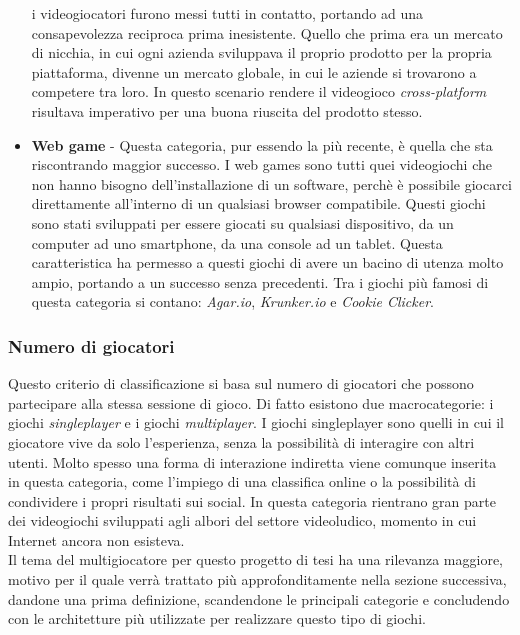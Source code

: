 \begin{itemize}
                    i videogiocatori furono messi tutti in contatto, portando ad una consapevolezza reciproca prima inesistente. Quello che prima era un mercato di nicchia, in cui
                    ogni azienda sviluppava il proprio prodotto per la propria piattaforma, divenne un mercato globale, in cui le aziende si trovarono a competere tra loro. In questo
                    scenario rendere il videogioco \textit{cross-platform} risultava imperativo per una buona riuscita del prodotto stesso. 
                \item \textbf{Web game} - Questa categoria, pur essendo la più recente, è quella che sta riscontrando maggior successo. I web games sono tutti quei videogiochi
                    che non hanno bisogno dell'installazione di un software, perchè è possibile giocarci direttamente all'interno di un qualsiasi browser compatibile. Questi giochi 
                    sono stati sviluppati per essere giocati su qualsiasi dispositivo, da un computer ad uno smartphone, da una console ad un tablet. Questa caratteristica ha 
                    permesso a questi giochi di avere un bacino di utenza molto ampio, portando a un successo senza precedenti. Tra i giochi più famosi di questa categoria si contano: 
                    \textit{Agar.io}, \textit{Krunker.io} e \textit{Cookie Clicker}.
            \end{itemize} 

        \subsubsection{Numero di giocatori}
            Questo criterio di classificazione si basa sul numero di giocatori che possono partecipare alla stessa sessione di gioco. Di fatto esistono due macrocategorie: i
            giochi \textit{singleplayer} e i giochi \textit{multiplayer}. I giochi singleplayer sono quelli in cui il giocatore vive da solo l'esperienza, senza la 
            possibilità di interagire con altri utenti. Molto spesso una forma di interazione indiretta viene comunque inserita in questa categoria, come l'impiego
            di una classifica online o la possibilità di condividere i propri risultati sui social. In questa categoria rientrano gran parte dei videogiochi sviluppati agli albori
            del settore videoludico, momento in cui Internet ancora non esisteva.\\
            Il tema del multigiocatore per questo progetto di tesi ha una rilevanza maggiore, motivo per il quale verrà trattato più approfonditamente nella sezione successiva, 
            dandone una prima definizione, scandendone le principali categorie e concludendo con le architetture più utilizzate per realizzare questo tipo di giochi.

